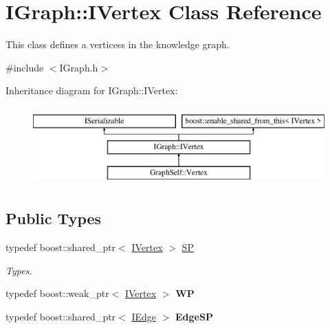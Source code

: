\hypertarget{class_i_graph_1_1_i_vertex}{}\section{I\+Graph\+:\+:I\+Vertex Class Reference}
\label{class_i_graph_1_1_i_vertex}


This class defines a vertices\textquotesingle{}s in the knowledge graph.  




{\ttfamily \#include $<$I\+Graph.\+h$>$}

Inheritance diagram for I\+Graph\+:\+:I\+Vertex\+:\begin{figure}[H]
\begin{center}
\leavevmode
\includegraphics[height=3.000000cm]{class_i_graph_1_1_i_vertex}
\end{center}
\end{figure}
\subsection*{Public Types}
\begin{DoxyCompactItemize}
\item 
\mbox{\label{class_i_graph_1_1_i_vertex_af72b9df91f110bc7824c608c10cc819c}} 
typedef boost\+::shared\+\_\+ptr$<$ \hyperlink{class_i_graph_1_1_i_vertex}{I\+Vertex} $>$ \hyperlink{class_i_graph_1_1_i_vertex_af72b9df91f110bc7824c608c10cc819c}{SP}
\begin{DoxyCompactList}\small\item\em Types. \end{DoxyCompactList}\item 
\mbox{\label{class_i_graph_1_1_i_vertex_a9ede3f4a5dfe4a97c01e9a4b3a8d34d0}} 
typedef boost\+::weak\+\_\+ptr$<$ \hyperlink{class_i_graph_1_1_i_vertex}{I\+Vertex} $>$ {\bfseries WP}
\item 
\mbox{\label{class_i_graph_1_1_i_vertex_a62bc11e3e62b8bf7b2ec9df6fc0e5e75}} 
typedef boost\+::shared\+\_\+ptr$<$ \hyperlink{class_i_graph_1_1_i_edge}{I\+Edge} $>$ {\bfseries Edge\+SP}
\end{DoxyCompactItemize}
